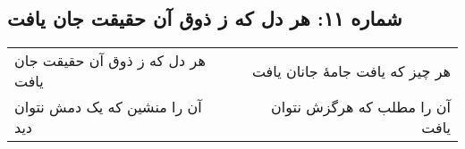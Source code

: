 \begin{center}
\section*{شماره ۱۱: هر دل که ز ذوق آن حقیقت جان یافت}
\label{sec:011}
\begin{longtable}{l p{0.5cm} r}
هر دل که ز ذوق آن حقیقت جان یافت
&&
هر چیز که یافت جامهٔ جانان یافت
\\
آن را منشین که یک دمش نتوان دید
&&
آن را مطلب که هرگزش نتوان یافت
\\
\end{longtable}
\end{center}

